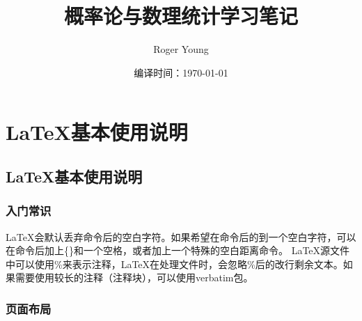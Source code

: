 \documentclass[11pt]{book}
\title{概率论与数理统计学习笔记}
\author{Roger Young}
\date{编译时间：\today}
\newcounter{#2}
\newcounter{#2}[#1]
\numberwithin{#2}{#1}
\begin{document}
	
	\maketitle
	\tableofcontents
	\newpage
	
\part{\LaTeX 基本使用说明}
	\chapter{\LaTeX 基本使用说明}
		\section{入门常识}
		
		\LaTeX 会默认丢弃命令后的空白字符。如果希望在命令后的到一个空白字符，可以在命令后加上\{\}和一个空格，或者加上一个特殊的空白距离命令。
		\LaTeX 源文件中可以使用\%来表示注释，\LaTeX 在处理文件时，会忽略\%后的改行剩余文本。如果需要使用较长的注释（注释块），可以使用verbatim包。
		\section{页面布局}
\end{document}
